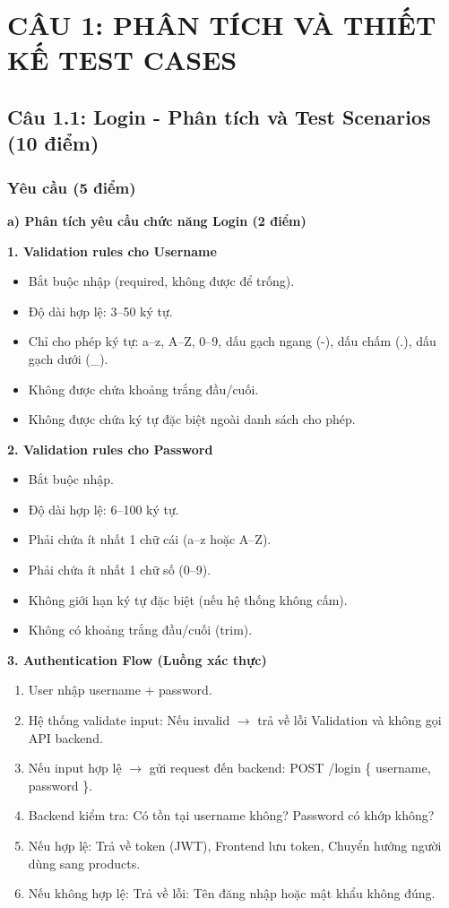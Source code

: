 \documentclass[a4paper,12pt]{article}
\begin{document}
\section{CÂU 1: PHÂN TÍCH VÀ THIẾT KẾ TEST CASES}

\subsection{Câu 1.1: Login - Phân tích và Test Scenarios (10 điểm)}

\subsubsection{Yêu cầu (5 điểm)}
\textbf{a) Phân tích yêu cầu chức năng Login (2 điểm)}

\textbf{1. Validation rules cho Username}
\begin{itemize}
    \item Bắt buộc nhập (required, không được để trống).
    \item Độ dài hợp lệ: 3--50 ký tự.
    \item Chỉ cho phép ký tự: a--z, A--Z, 0--9, dấu gạch ngang (-), dấu chấm (.), dấu gạch dưới (\_).
    \item Không được chứa khoảng trắng đầu/cuối.
    \item Không được chứa ký tự đặc biệt ngoài danh sách cho phép.
\end{itemize}

\textbf{2. Validation rules cho Password}
\begin{itemize}
    \item Bắt buộc nhập.
    \item Độ dài hợp lệ: 6--100 ký tự.
    \item Phải chứa ít nhất 1 chữ cái (a--z hoặc A--Z).
    \item Phải chứa ít nhất 1 chữ số (0--9).
    \item Không giới hạn ký tự đặc biệt (nếu hệ thống không cấm).
    \item Không có khoảng trắng đầu/cuối (trim).
\end{itemize}

\textbf{3. Authentication Flow (Luồng xác thực)}
\begin{enumerate}
    \item User nhập username + password.
    \item Hệ thống validate input: Nếu invalid $\rightarrow$ trả về lỗi Validation và không gọi API backend.
    \item Nếu input hợp lệ $\rightarrow$ gửi request đến backend: POST /login \{ username, password \}.
    \item Backend kiểm tra: Có tồn tại username không? Password có khớp không?
    \item Nếu hợp lệ: Trả về token (JWT), Frontend lưu token, Chuyển hướng người dùng sang products.
    \item Nếu không hợp lệ: Trả về lỗi: Tên đăng nhập hoặc mật khẩu không đúng.
\end{enumerate}
\end{document}
